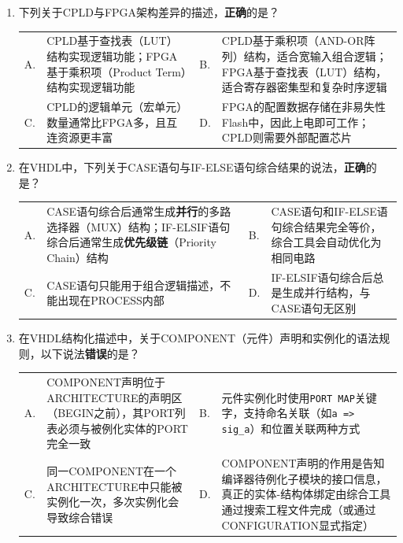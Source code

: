 \begin{enumerate}[label=\arabic*.]

\item 下列关于CPLD与FPGA架构差异的描述，\textbf{正确}的是？

\vspace{0.2cm}

\begin{tabular}{@{}lp{}@{\qquad}lp{}@{}}
A. & CPLD基于查找表（LUT）结构实现逻辑功能；FPGA基于乘积项（Product Term）结构实现逻辑功能 &
B. & CPLD基于乘积项（AND-OR阵列）结构，适合宽输入组合逻辑；FPGA基于查找表（LUT）结构，适合寄存器密集型和复杂时序逻辑 \\
C. & CPLD的逻辑单元（宏单元）数量通常比FPGA多，且互连资源更丰富 &
D. & FPGA的配置数据存储在非易失性Flash中，因此上电即可工作；CPLD则需要外部配置芯片 \\
\end{tabular}

\vspace{0.6cm}

\item 在VHDL中，下列关于CASE语句与IF-ELSE语句综合结果的说法，\textbf{正确}的是？

\vspace{0.2cm}

\begin{tabular}{@{}lp{}@{\qquad}lp{}@{}}
A. & CASE语句综合后通常生成\textbf{并行}的多路选择器（MUX）结构；IF-ELSIF语句综合后通常生成\textbf{优先级链}（Priority Chain）结构 &
B. & CASE语句和IF-ELSE语句综合结果完全等价，综合工具会自动优化为相同电路 \\
C. & CASE语句只能用于组合逻辑描述，不能出现在PROCESS内部 &
D. & IF-ELSIF语句综合后总是生成并行结构，与CASE语句无区别 \\
\end{tabular}

\vspace{0.6cm}

\item 在VHDL结构化描述中，关于COMPONENT（元件）声明和实例化的语法规则，以下说法\textbf{错误}的是？

\vspace{0.2cm}

\begin{tabular}{@{}lp{}@{\qquad}lp{}@{}}
A. & COMPONENT声明位于ARCHITECTURE的声明区（BEGIN之前），其PORT列表必须与被例化实体的PORT完全一致 &
B. & 元件实例化时使用\texttt{PORT MAP}关键字，支持命名关联（如\texttt{a => sig\_a}）和位置关联两种方式 \\
C. & 同一COMPONENT在一个ARCHITECTURE中只能被实例化一次，多次实例化会导致综合错误 &
D. & COMPONENT声明的作用是告知编译器待例化子模块的接口信息，真正的实体-结构体绑定由综合工具通过搜索工程文件完成（或通过CONFIGURATION显式指定） \\
\end{tabular}


\end{enumerate}

